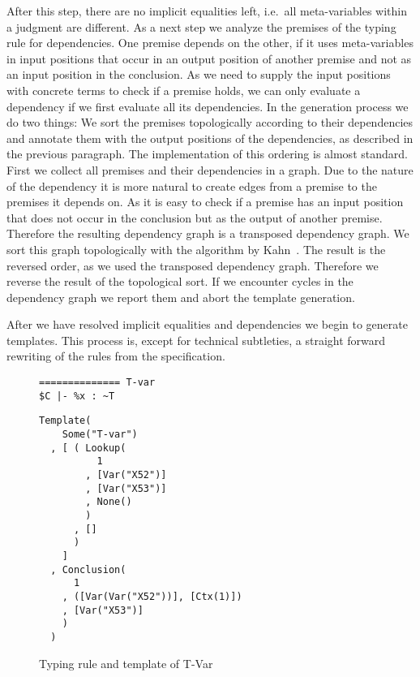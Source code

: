 After this step, there are no implicit equalities left, i.e.\ all
meta-variables within a judgment are different. As a next step we
analyze the premises of the typing rule for dependencies. One premise
depends on the other, if it uses meta-variables in input positions
that occur in an output position of another premise and not as an
input position in the conclusion. As we need to supply the input
positions with concrete terms to check if a premise holds, we can only
evaluate a dependency if we first evaluate all its dependencies. In
the generation process we do two things: We sort the premises
topologically according to their dependencies and annotate them with
the output positions of the dependencies, as described in the previous
paragraph. The implementation of this ordering is almost
standard. First we collect all premises and their dependencies in a
graph. Due to the nature of the dependency it is more natural to
create edges from a premise to the premises it depends on. As it is
easy to check if a premise has an input position that does not occur
in the conclusion but as the output of another premise. Therefore the
resulting dependency graph is a transposed dependency graph. We sort
this graph topologically with the algorithm by
Kahn~\cite{Kahn:1962:TSL:368996.369025}. The result is the reversed
order, as we used the transposed dependency graph. Therefore we
reverse the result of the topological sort. If we encounter cycles in
the dependency graph we report them and abort the template generation.

After we have resolved implicit equalities and dependencies we begin
to generate templates. This process is, except for technical
subtleties, a straight forward rewriting of the rules from the
specification.

\begin{figure}
  \centering
  \begin{minipage}{.35\linewidth}
\begin{lstlisting}[language=sltc]
%x : ~T in $C
============== T-var
$C |- %x : ~T
\end{lstlisting}
  \end{minipage}
  \begin{minipage}{.55\linewidth}
\begin{lstlisting}[language=sltc]
Template(
    Some("T-var")
  , [ ( Lookup(
          1
        , [Var("X52")]
        , [Var("X53")]
        , None()
        )
      , []
      )
    ]
  , Conclusion(
      1
    , ([Var(Var("X52"))], [Ctx(1)])
    , [Var("X53")]
    )
  )
\end{lstlisting}
  \end{minipage}
  \caption{Typing rule and template of T-Var}
  \label{fig:template-example}
\end{figure}
